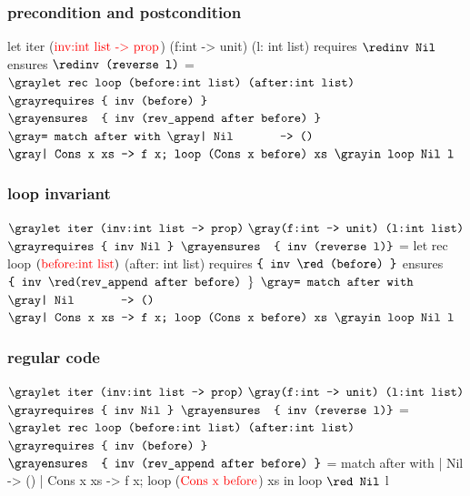 \begin{frame}[fragile]
\frametitle{precondition and postcondition}
\begin{footnotesize}
\begin{whycode}
let iter ($\textcolor{red}{\text{inv:int list -> prop}}$) (f:int -> unit) (l: int list)
requires { ${\red \texttt{inv Nil}}$ }
ensures  { ${\red \texttt{inv (reverse l)}}$ } 
= ${\gray\texttt{let rec loop (before:int list) (after:int list)}}$
  ${\gray\texttt{requires \{ inv (before) \} }}$
  ${\gray\texttt{ensures~ \{ inv (rev\_append after before) \}}}$  
  ${\gray\texttt{= match after with}}$
     ${\gray\texttt{| Nil~~~~~~ -> ()}}$
     ${\gray\texttt{| Cons x xs -> f x; loop (Cons x before) xs}}$
  ${\gray\texttt{in loop Nil l }}$
\end{whycode}
\end{footnotesize}
\end{frame}
\addtocounter{framenumber}{-1}



\begin{frame}[fragile]
\frametitle{loop invariant}
\begin{footnotesize}
\begin{whycode}
${\gray\texttt{let iter (inv:int list -> prop)}} ~
{\gray\texttt{(f:int -> unit) (l:int list)}}$
${\gray\texttt{requires \{ inv Nil \}}}$
${\gray\texttt{ensures~ \{ inv (reverse l)\}}}$    
= let rec loop $(\textcolor{red}{\text{before:int list}})$ (after: int list) 
  requires $\texttt{\{ inv {\red (before)} \}}$
  ensures  $\texttt{\{ inv {\red(rev\_append after before)} }\}$  
  ${\gray\texttt{= match after with}}$
     ${\gray\texttt{| Nil~~~~~~ -> ()}}$
     ${\gray\texttt{| Cons x xs -> f x; loop (Cons x before) xs}}$
  ${\gray\texttt{in loop Nil l }}$
\end{whycode}
\end{footnotesize}
\end{frame}
\addtocounter{framenumber}{-1}


\begin{frame}[fragile]
\frametitle{regular code}
\begin{footnotesize}
\begin{whycode}
${\gray\texttt{let iter (inv:int list -> prop)}} ~
{\gray\texttt{(f:int -> unit) (l:int list)}}$
${\gray\texttt{requires \{ inv Nil \}}}$
${\gray\texttt{ensures~ \{ inv (reverse l)\}}}$    
= ${\gray\texttt{let rec loop (before:int list) (after:int list)}}$
  ${\gray\texttt{requires \{ inv (before) \} }}$
  ${\gray\texttt{ensures~ \{ inv (rev\_append after before) \}}}$
  = match after with 
     | Nil       -> ()
     | Cons x xs -> f x; loop ($\textcolor{red}{\text{Cons x before}}$) xs 
  in loop $\texttt{\red Nil}$ l 
\end{whycode}
\end{footnotesize}
\end{frame}
\addtocounter{framenumber}{-1}

